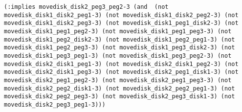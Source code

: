 \documentclass[12pt,letterpaper]{ntdhw}
\begin{document}
\begin{enumerate}
\begin{enumerate}
\begin{lstlisting}[language=pddl, style=pddlstyle,
  basicstyle=\scriptsize]
(:implies movedisk_disk2_peg3_peg2-3 (and  (not movedisk_disk1_disk2_peg1-3) (not movedisk_disk1_disk2_peg2-3) (not movedisk_disk1_disk2_peg3-3) (not movedisk_disk1_peg1_disk2-3) (not movedisk_disk1_peg1_peg2-3) (not movedisk_disk1_peg1_peg3-3) (not movedisk_disk1_peg2_disk2-3) (not movedisk_disk1_peg2_peg1-3) (not movedisk_disk1_peg2_peg3-3) (not movedisk_disk1_peg3_disk2-3) (not movedisk_disk1_peg3_peg1-3) (not movedisk_disk1_peg3_peg2-3) (not movedisk_disk2_disk1_peg1-3) (not movedisk_disk2_disk1_peg2-3) (not movedisk_disk2_disk1_peg3-3) (not movedisk_disk2_peg1_disk1-3) (not movedisk_disk2_peg1_peg2-3) (not movedisk_disk2_peg1_peg3-3) (not movedisk_disk2_peg2_disk1-3) (not movedisk_disk2_peg2_peg1-3) (not movedisk_disk2_peg2_peg3-3) (not movedisk_disk2_peg3_disk1-3) (not movedisk_disk2_peg3_peg1-3)))

        \end{lstlisting}
    \end{enumerate} 


\end{enumerate}
\end{document}

